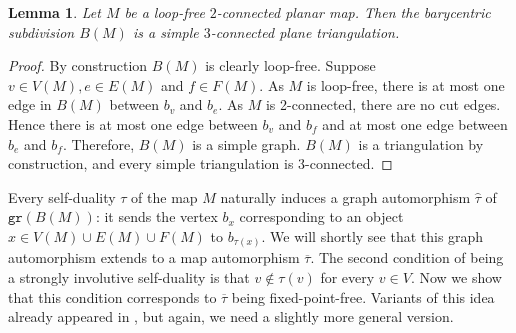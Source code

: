 \documentclass[10pt,a4paper]{article}
\newtheorem{lemma}[theorem]{Lemma}
\newcommand{\gr}{\mathtt{gr}}
\begin{document}
\begin{lemma}\label{lem:barycentric3conn}
Let $M$ be a loop-free $2$-connected planar map. Then the barycentric subdivision $B(M)$ is a simple $3$-connected plane triangulation.
\end{lemma}
\begin{proof}
    By construction $B(M)$ is clearly loop-free. Suppose $v\in V(M),e\in E(M)$ and $f\in F(M)$. As $M$ is loop-free, there is at most one edge in $B(M)$ between $b_v$ and $b_e$. As $M$ is 2-connected, there are no cut edges. Hence there is at most one edge between $b_v$ and $b_f$ and at most one edge between $b_e$ and $b_f$. Therefore, $B(M)$ is a simple graph. $B(M)$ is a triangulation by construction, and every simple triangulation is 3-connected.
       
\end{proof}

Every self-duality $\tau$ of the map $M$ naturally induces a graph automorphism $\widehat{\tau}$ of $\gr(B(M))$: it sends the vertex $b_x$ corresponding to an object $x\in V(M)\cup E(M)\cup F(M)$ to $b_{\tau(x)}$. We will shortly see that this graph automorphism extends to a map automorphism $\overline{\tau}$. The second condition of being a strongly involutive self-duality is that $v\notin \tau(v)$ for every $v\in V$. Now we show that this condition corresponds to $\overline{\tau}$ being fixed-point-free. Variants of this idea already appeared in \cite{kupitz2010ball,bracho2020strongly,montejano2022self}, but again, we need a slightly more general version.
\end{document}
